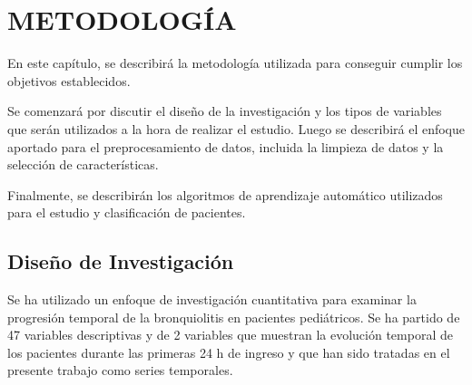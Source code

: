 \section{METODOLOGÍA}\label{sec:methodology}

En este capítulo, se describirá la metodología utilizada para conseguir cumplir los objetivos establecidos. 

Se comenzará por discutir el diseño de la investigación y los tipos de variables que serán utilizados a la hora de realizar el estudio. Luego se describirá el enfoque aportado para el preprocesamiento de datos, incluida la limpieza de datos y la selección de características.

Finalmente, se describirán los algoritmos de aprendizaje automático utilizados para el estudio y clasificación de pacientes. 

\subsection{Diseño de Investigación}

Se ha utilizado un enfoque de investigación cuantitativa para examinar la progresión temporal de la bronquiolitis en pacientes pediátricos. Se ha partido de 47 variables descriptivas y de 2 variables que muestran la evolución temporal de los pacientes durante las primeras 24 h de ingreso y que han sido tratadas en el presente trabajo como series temporales. 
